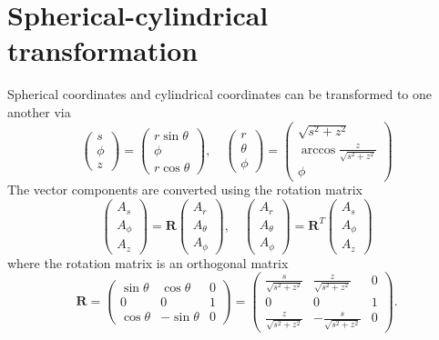 \section{Spherical-cylindrical transformation}

Spherical coordinates and cylindrical coordinates can be transformed to one another via
\begin{equation}
    \begin{pmatrix}
        s \\ \phi \\ z
    \end{pmatrix} = 
    \begin{pmatrix}
        r\sin\theta \\ \phi \\ r\cos\theta
    \end{pmatrix},\quad 
    \begin{pmatrix}
        r \\ \theta \\ \phi
    \end{pmatrix} = 
    \begin{pmatrix}
        \sqrt{s^2 + z^2} \\ \arccos \frac{z}{\sqrt{s^2 + z^2}} \\ \phi
    \end{pmatrix}
\end{equation}
The vector components are converted using the rotation matrix
\begin{equation}
    \begin{pmatrix} A_s \\ A_\phi \\ A_z \end{pmatrix} = \mathbf{R} 
    \begin{pmatrix} A_r \\ A_\theta \\ A_\phi \end{pmatrix},\quad
    \begin{pmatrix} A_r \\ A_\theta \\ A_\phi \end{pmatrix} = \mathbf{R}^T 
    \begin{pmatrix} A_s \\ A_\phi \\ A_z \end{pmatrix}
\end{equation}
where the rotation matrix is an orthogonal matrix
\begin{equation}
    \mathbf{R} = \begin{pmatrix}
        \sin\theta & \cos\theta & 0 \\ 
        0 & 0 & 1 \\ 
        \cos\theta & -\sin\theta & 0
    \end{pmatrix} = \begin{pmatrix}
        \frac{s}{\sqrt{s^2 + z^2}} & \frac{z}{\sqrt{s^2 + z^2}} & 0 \\ 
        0 & 0 & 1 \\ 
        \frac{z}{\sqrt{s^2 + z^2}} & -\frac{s}{\sqrt{s^2 + z^2}} & 0
    \end{pmatrix}.
\end{equation}
